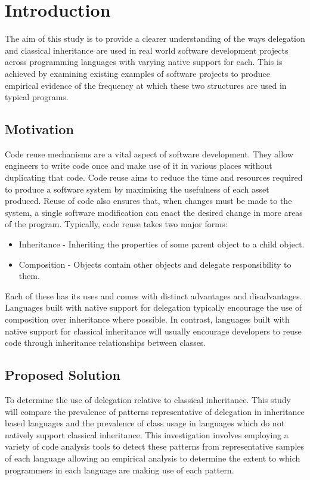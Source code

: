 \chapter{Introduction}\label{C:intro}
The aim of this study is to provide a clearer understanding of the ways delegation and classical inheritance are used in real world software development projects across programming languages with varying native support for each. This is achieved by examining existing examples of software projects to produce empirical evidence of the frequency at which these two structures are used in typical programs.

\section{Motivation}
Code reuse mechanisms are a vital aspect of software development. They allow engineers to write code once and make use of it in various places without duplicating that code. Code reuse aims to reduce the time and resources required to produce a software system by maximising the usefulness of each asset produced. Reuse of code also ensures that, when changes must be made to the system, a single software modification can enact the desired change in more areas of the program.
\newline
Typically, code reuse takes two major forms:
\begin{itemize}
	\item Inheritance - Inheriting the properties of some parent object to a child object.
	\item Composition - Objects contain other objects and delegate responsibility to them.
\end{itemize}
Each of these has its uses and comes with distinct advantages and disadvantages. Languages built with native support for delegation typically encourage the use of composition over inheritance where possible. In contrast, languages built with native support for classical inheritance will usually encourage developers to reuse code through inheritance relationships between classes.

\section{Proposed Solution}
To determine the use of delegation relative to classical inheritance. This study will compare the prevalence of patterns representative of delegation in inheritance based languages and the prevalence of class usage in languages which do not natively support classical inheritance. This investigation involves employing a variety of code analysis tools to detect these patterns from representative samples of each language allowing an empirical analysis to determine the extent to which programmers in each language are making use of each pattern.

